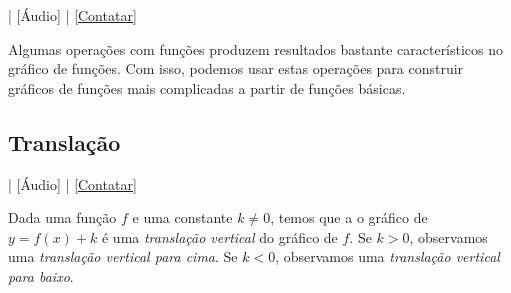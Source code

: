 \begin{flushright}
  [Vídeo] | [Áudio] | \href{https://phkonzen.github.io/notas/contato.html}{[Contatar]}
\end{flushright}

Algumas operações com funções produzem resultados bastante característicos no gráfico de funções. Com isso, podemos usar estas operações para construir gráficos de funções mais complicadas a partir de funções básicas.

\subsection{Translação}

\begin{flushright}
  [Vídeo] | [Áudio] | \href{https://phkonzen.github.io/notas/contato.html}{[Contatar]}
\end{flushright}

Dada uma função $f$ e uma constante $k\neq 0$, temos que a o gráfico de $y = f(x) + k$ é uma \emph{translação vertical} do gráfico de $f$. Se $k>0$, observamos uma \emph{translação vertical para cima}. Se $k<0$, observamos uma \emph{translação vertical para baixo}.

